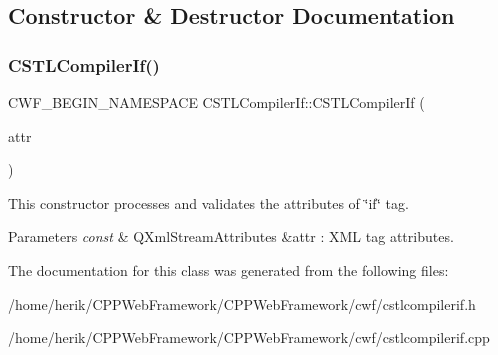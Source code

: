 \subsection{Constructor \& Destructor Documentation}
\mbox{\label{class_c_s_t_l_compiler_if_a6d9ff3428d392123f5139d8ca65e5322}} 
\subsubsection{\texorpdfstring{C\+S\+T\+L\+Compiler\+If()}{CSTLCompilerIf()}}
{\footnotesize\ttfamily C\+W\+F\+\_\+\+B\+E\+G\+I\+N\+\_\+\+N\+A\+M\+E\+S\+P\+A\+CE C\+S\+T\+L\+Compiler\+If\+::\+C\+S\+T\+L\+Compiler\+If (\begin{DoxyParamCaption}\item[{const Q\+Xml\+Stream\+Attributes \&}]{attr }\end{DoxyParamCaption})\hspace{0.3cm}{\ttfamily [explicit]}}



This constructor processes and validates the attributes of \char`\"{}if\char`\"{} tag. 


\begin{DoxyParams}{Parameters}
{\em const} & Q\+Xml\+Stream\+Attributes \&attr \+: X\+ML tag attributes. \\
\hline
\end{DoxyParams}


The documentation for this class was generated from the following files\+:\begin{DoxyCompactItemize}
\item 
/home/herik/\+C\+P\+P\+Web\+Framework/\+C\+P\+P\+Web\+Framework/cwf/cstlcompilerif.\+h\item 
/home/herik/\+C\+P\+P\+Web\+Framework/\+C\+P\+P\+Web\+Framework/cwf/cstlcompilerif.\+cpp\end{DoxyCompactItemize}
